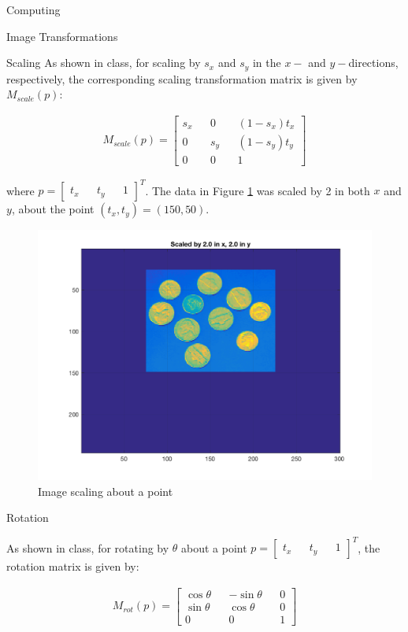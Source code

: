 \begin{section}{Computing}
\begin{homeworkSection}{Image Transformations}
\begin{subsubsection}{Scaling}
As shown in class, for scaling by $s_x$ and $s_y$ in the $x-$ and $y-$directions, respectively, the corresponding scaling transformation matrix is given by $M_{scale}(p)$:

\begin{align*}
    M_{scale}(p) = \begin{bmatrix} s_x && 0 && (1-s_x)t_x \\
        0 && s_y && (1-s_y)t_y \\
        0 && 0 && 1 \end{bmatrix}
\end{align*}

where $p = \begin{bmatrix} t_x && t_y && 1 \end{bmatrix}^T$. 
The data in Figure \ref{fig:scaled} was scaled by 2 in both $x$ and $y$, about the point $(t_x, t_y) = (150, 50)$. 

\begin{figure}[!h]
\centering
\includegraphics[width=0.75\columnwidth]{../data/scaled} %
\caption{Image scaling about a point}
\label{fig:scaled}
\end{figure}
\end{subsubsection}


\begin{subsubsection}{Rotation}

As shown in class, for rotating by $\theta$ about a point $p = \begin{bmatrix} t_x && t_y && 1 \end{bmatrix}^T$, the rotation matrix is given by:

\begin{align*}
    M_{rot}(p) = \begin{bmatrix} \cos \theta && -\sin\theta && 0 \\
        \sin\theta && \cos\theta && 0 \\
        0 && 0 && 1 \end{bmatrix}
\end{align*}


\end{subsubsection}
\end{homeworkSection}
\end{section}
